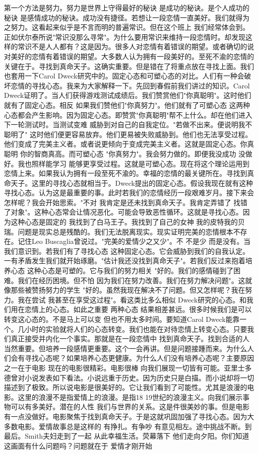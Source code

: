 第一个方法是努力。努力是世界上守得最好的秘诀 是成功的秘诀。是个人成功的秘诀 是感情成功的秘诀。成功没有捷径。若想让一段恋情一直美好。我们就得为之努力。这看起来似乎是不言而明的普遍常识。但在这个班上 我们经常体会到。正如伏尔泰所说"常识没那么寻常"。为什么要用常识来维持一段恋情时。却发现这样的常识不是人人都有？这是因为。很多人对恋情有着错误的期望。或者确切的说 对美好的恋情有着错误的期望。大多数人认为拥有一段美好的。至死不渝的恋情的关键在于。寻找到真命天子。这确实重要。但是错在了将重点放在寻找上面。我们也套用一下Carol Dweck研究中的。固定心态和可塑心态的对比。人们有一种会破坏恋情的寻找心态。我来为大家解释一下。先回到春假前我们讲过的知识。Carol Dweck证明了。当人们获得游戏测试成绩后。我们赞赏他们"你真聪明"。这时他们就有了固定心态。相反 如果我们赞他们"你真努力"。他们就有了可塑心态 这两种心态都会产生影响。因为固定心态。即赞赏"你真聪明"帮不上什么。却在他们进入下一轮测试时。当测试变难 威胁到对自己的自我定位。"若做不出来。便说明我不聪明了" 这时他们便更容易放弃。他们更易被失败威胁到。他们也无法享受过程。他们变成了完美主义者。或者说更倾向于变成完美主义者。这就是固定心态。你真聪明 你的智商真高。而可塑心态 "你真努力"。我会努力做的。即便我没成功 没做好。我也照样能学习 能够更享受过程。这就是可塑心态。现在将这个理论运用到恋情上来。如果我认为拥有一段至死不渝的。幸福的恋情的最关键所在。寻找到真命天子。这里的寻找心态就相当于。Dweck提出的固定心态。假设我现在就有这种寻找心态。认为这是最重要的事。此时若我们的恋情经历一段艰难岁月。接下来会怎样呢？我会开始思索。"不对 我肯定是还未找到真命天子。我肯定弄错了 找错了对象"。这种心态常会让情况恶化。可能会导致恶性循环。这就是寻找心态。因为这种心态是固定的 我找到了白马王子。我找到了自己的女神 我的皮特我的贝瑞。问题是现实总是残酷的。我们无法脱离现实。现实证明完美的恋情根本不存在。记住Leo Buscaglia曾说过。"完美的爱情少之又少"。不 不是少 而是没有。当我们意识到。若我们有了寻找心态 这种固定心态。它会威胁到我们的自我认定。一有矛盾发生我们就开始琢磨。"估计我还没找到真命天子"。若我们反过来抱着培养心态 这种心态是可塑的。它与我们的努力相关 "好的。我们的感情碰到了困难。我们在经历困境。但不怕 因为我们在努力改善。我们在努力解决问题"。这就像那些被赞扬努力的学生 "好的。虽然我现在解决不了问题。但又怎样呢？我在努力。我在尝试 我甚至在享受这过程"。看这类比多么相似 Dweck研究的心态。和我们用在恋情上的心态。如此之重要 两种心态 结果相差甚远。很多时候我们是可以转变这心态的。不是马上可以变 但也不用太多时间。要知道Carol Dweck能靠一个。几小时的实验就将人们的心态转变。我们也能在对待恋情上转变心态。只要我们真正接受并内化一个事实。那就是在一段恋情中 找到真命天子。找到合适的人 当然重要。但培养一段感情更重要。这个一会再讲。但是问题接踵而来。为什么人们会有寻找心态呢？如果培养心态更健康。为什么人们没有培养心态呢？主要原因之一在于电影 现在的电影很精彩。电影很棒 向我们展现一切皆有可能。亚里士多德曾对小说发表如下看法。小说远重于历史。因为历史只是白描。而小说却将一切描述到了极致。所以说电影是很美好的。它让我们看到了可能性。尤其是浪漫的电影。这里的浪漫不是指爱情上的浪漫。是指18 19世纪的浪漫主义。向我们展示事物可以有多美好。潜在的人性 我们与世界的关系。这是件很美妙的事。但是电影有一点没做好。电影聚焦于找到真命天子。于是这就巩固加强了寻找心态。因为大多数电影。爱情故事总是这样的 有挣扎。有争吵 有意见相左。途中挑战不断。到最后。Smith夫妇走到了一起 从此幸福生活。荧幕落下 他们走向夕阳。你们知道这画面有什么问题吗？问题就在于 爱情才刚开始 